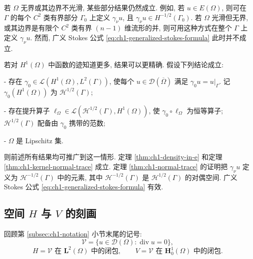 \begin{Remark}
\label{rem:ch1-nonsmooth-trace}
若 $\Omega$ 无界或其边界不光滑, 某些部分结果仍然成立. 例如, 若 $u\in E(\Omega)$, 则可在 $\Gamma$ 的每个 $C^2$ 类有界部分 $\Gamma_0$ 上定义 $\gamma_\nu u$, 且 $\gamma_\nu u\in H^{-1/2}(\Gamma_0)$. 若 $\Omega$ 光滑但无界, 或其边界是有限个 $C^2$ 类有界 $(n-1)$ 维流形的并, 则可用这种方式在整个 $\Gamma$ 上定义 $\gamma_\nu u$. 然而, 广义 Stokes 公式 \eqref{eq:ch1-generalized-stokes-formula} 此时并不成立.

若对 $H^1(\Omega)$ 中函数的迹知道更多, 结果可以更精确. 假设下列结论成立:

- 存在 $\gamma_0\in\mathcal L(H^1(\Omega),L^2(\Gamma))$, 使每个 $u\in\mathcal D(\overline\Omega)$ 满足 $\gamma_0u=u|_\Gamma$. 记 $\gamma_0(H^1(\Omega))$ 为 $\mathcal H^{1/2}(\Gamma)$;

- 存在提升算子 $\ell_\Omega\in\mathcal L(\mathcal H^{1/2}(\Gamma),H^1(\Omega))$, 使 $\gamma_0\circ\ell_\Omega$ 为恒等算子; $\mathcal H^{1/2}(\Gamma)$ 配备由 $\gamma_0$ 携带的范数;

- $\Omega$ 是 Lipschitz 集.

则前述所有结果均可推广到这一情形. 定理 \ref{thm:ch1-density-in-e} 和定理 \ref{thm:ch1-kernel-normal-trace} 成立. 定理 \ref{thm:ch1-normal-trace} 的证明把 $\gamma_\nu u$ 定义为 $\mathcal H^{-1/2}(\Gamma)$ 中的元素, 其中 $\mathcal H^{-1/2}(\Gamma)$ 是 $\mathcal H^{1/2}(\Gamma)$ 的对偶空间. 广义 Stokes 公式 \eqref{eq:ch1-generalized-stokes-formula} 有效.
\end{Remark}

\subsection{空间 \texorpdfstring{$H$ 与 $V$}{H 与 V} 的刻画}
\label{subsec:ch1-characterization-h-v}

回顾第 \ref{subsec:ch1-notation} 小节末尾的记号:
\[
\mathcal V=\{u\in\mathbf{\mathcal D}(\Omega):\operatorname{div}u=0\},
\]
\[
H=\mathcal V\text{ 在 }\mathbf L^2(\Omega)\text{ 中的闭包},
\qquad
V=\mathcal V\text{ 在 }\mathbf H_0^1(\Omega)\text{ 中的闭包}.
\]

